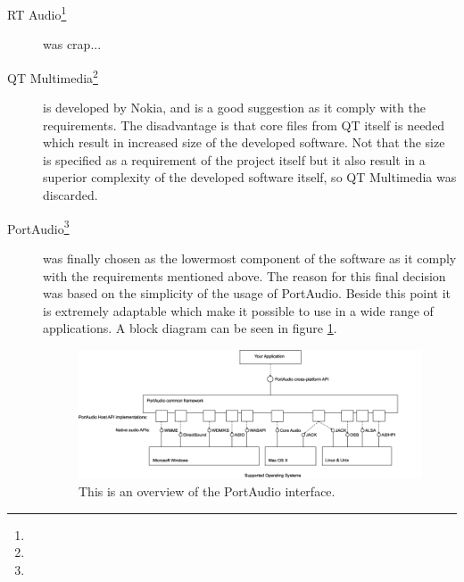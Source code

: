 \begin{description}
\item[RT Audio\footnote{}] was crap...

\item[QT Multimedia\footnote{}] is developed by Nokia, and is a good suggestion as it comply with the requirements. The disadvantage is that core files from QT itself is needed which result in increased size of the developed software. Not that the size is specified as a requirement of the project itself but it also result in a superior complexity of the developed software itself, so QT Multimedia was discarded.

\item[PortAudio\footnote{}] was finally chosen as the lowermost component of the software as it comply with the requirements mentioned above.  The reason for this final decision was based on the simplicity of the usage of PortAudio. Beside this point it is extremely adaptable which make it possible to use in a wide range of applications. A block diagram can be seen in figure \ref{fig:app_portaudio}.

\begin{figure}[!h]
	\begin{center}
	\includegraphics[scale=0.4,trim=0 0 0 0]{content/graphics/appendix/portaudio_architecture.png}%
	\caption{This is an overview of the PortAudio interface.}
	\label{fig:app_portaudio}
	\end{center}
\end{figure}

\end{description}